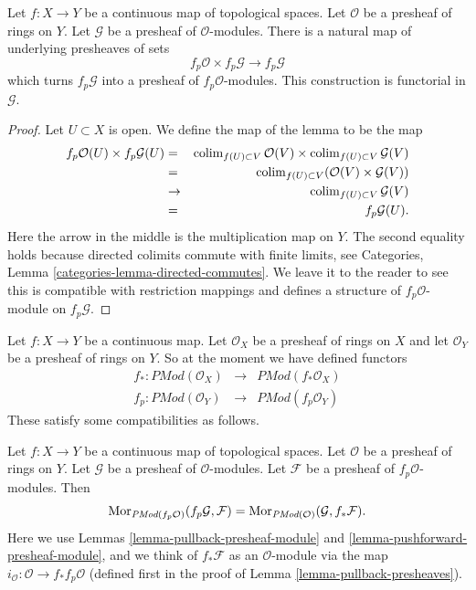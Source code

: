 \begin{lemma}
\label{lemma-pullback-presheaf-module}
Let $f : X \to Y$ be a continuous map of topological spaces.
Let $\mathcal{O}$ be a presheaf of rings on $Y$. Let
$\mathcal{G}$ be a presheaf of $\mathcal{O}$-modules.
There is a natural map of underlying presheaves of sets
$$
f_p\mathcal{O} \times f_p\mathcal{G}
\longrightarrow
f_p\mathcal{G}
$$
which turns $f_p\mathcal{G}$ into a presheaf of $f_p\mathcal{O}$-modules.
This construction is functorial in $\mathcal{G}$.
\end{lemma}

\begin{proof}
Let $U \subset X$ is open. We define the map of the lemma
to be the map
\begin{eqnarray*}
f_p\mathcal{O}(U) \times f_p\mathcal{G}(U)
& = &
\mathop{\mathrm{colim}}\nolimits_{f(U) \subset V} \mathcal{O}(V)
\times
\mathop{\mathrm{colim}}\nolimits_{f(U) \subset V} \mathcal{G}(V) \\
& = &
\mathop{\mathrm{colim}}\nolimits_{f(U) \subset V} (\mathcal{O}(V)\times \mathcal{G}(V)) \\
& \to &
\mathop{\mathrm{colim}}\nolimits_{f(U) \subset V} \mathcal{G}(V) \\
& = &
f_p\mathcal{G}(U).
\end{eqnarray*}
Here the arrow in the middle is the multiplication map on $Y$.
The second equality holds because directed colimits commute
with finite limits, see
Categories, Lemma \ref{categories-lemma-directed-commutes}.
We leave it to the reader to see this is compatible with
restriction mappings and defines a structure of
$f_p\mathcal{O}$-module on $f_p\mathcal{G}$.
\end{proof}

\noindent
Let $f : X \to Y$ be a continuous map.
Let $\mathcal{O}_X$ be a presheaf of rings on $X$ and
let $\mathcal{O}_Y$ be a presheaf of rings on $Y$.
So at the moment we have defined functors
\begin{eqnarray*}
f_* : \textit{PMod}(\mathcal{O}_X) &
\longrightarrow &
\textit{PMod}(f_*\mathcal{O}_X) \\
f_p : \textit{PMod}(\mathcal{O}_Y) &
\longrightarrow &
\textit{PMod}(f_p\mathcal{O}_Y)
\end{eqnarray*}
These satisfy some compatibilities as follows.

\begin{lemma}
\label{lemma-adjoint-push-pull-presheaves-modules}
Let $f : X \to Y$ be a continuous map of topological spaces.
Let $\mathcal{O}$ be a presheaf of rings on $Y$.
Let $\mathcal{G}$ be a presheaf of $\mathcal{O}$-modules.
Let $\mathcal{F}$ be a presheaf of $f_p\mathcal{O}$-modules.
Then
$$
\mathop{\mathrm{Mor}}\nolimits_{\textit{PMod}(f_p\mathcal{O})}(f_p\mathcal{G}, \mathcal{F})
=
\mathop{\mathrm{Mor}}\nolimits_{\textit{PMod}(\mathcal{O})}(\mathcal{G}, f_*\mathcal{F}).
$$
Here we use
Lemmas \ref{lemma-pullback-presheaf-module}
and \ref{lemma-pushforward-presheaf-module}, and we think of
$f_*\mathcal{F}$ as an $\mathcal{O}$-module via the map
$i_\mathcal{O} : \mathcal{O} \to f_*f_p\mathcal{O}$
(defined first in the proof of Lemma \ref{lemma-pullback-presheaves}).
\end{lemma}

